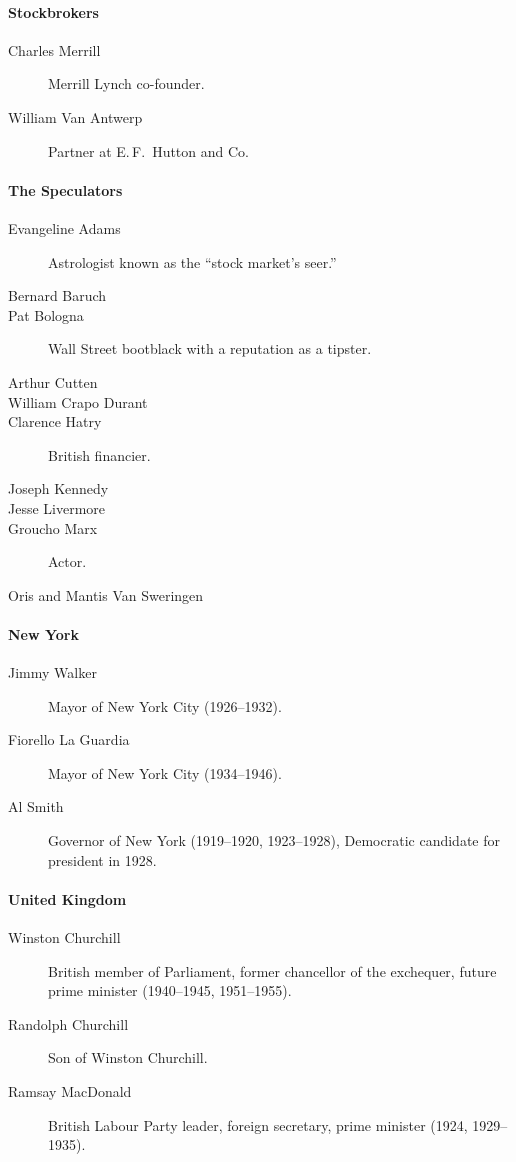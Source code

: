 \documentclass[11pt]{article}
\begin{document}
\paragraph{Stockbrokers}
\begin{description}
\item[Charles Merrill] Merrill Lynch co-founder.
\item[William Van Antwerp] Partner at E.\,F.\ Hutton and Co.
\end{description}

\paragraph{The Speculators}
\begin{description}
\item[Evangeline Adams] Astrologist known as the ``stock market's seer.''
\item[Bernard Baruch]
\item[Pat Bologna] Wall Street bootblack with a reputation as a tipster.
\item[Arthur Cutten]
\item[William Crapo Durant]
\item[Clarence Hatry] British financier.
\item[Joseph Kennedy]
\item[Jesse Livermore]
\item[Groucho Marx] Actor.
\item[Oris and Mantis Van Sweringen]
\end{description}

\paragraph{New York}
\begin{description}
\item[Jimmy Walker] Mayor of New York City (1926--1932).
\item[Fiorello La Guardia] Mayor of New York City (1934--1946).
\item[Al Smith] Governor of New York (1919--1920, 1923--1928), Democratic
candidate for president in 1928.
\end{description}

\paragraph{United Kingdom}
\begin{description}
\item[Winston Churchill] British member of Parliament, former chancellor of
the exchequer, future prime minister (1940--1945, 1951--1955).
\item[Randolph Churchill] Son of Winston Churchill.
\item[Ramsay MacDonald] British Labour Party leader, foreign secretary, prime
minister (1924, 1929--1935).
\end{description}
\end{document}
